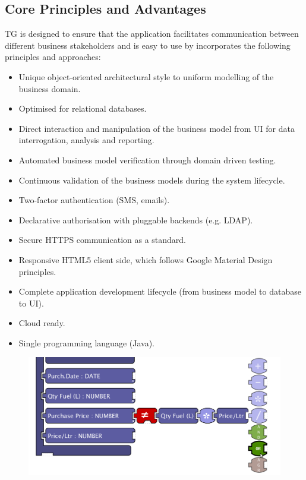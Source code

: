 \documentclass[a4paper,12pt,twocolumn,oneside,openright,final]{memoir}
\begin{document}
 \subsection*{Core Principles and Advantages}
  TG is designed to ensure that the application facilitates communication between different business stakeholders and is easy to use by incorporates the following principles and approaches:

  \begin{itemize}
    \item Unique object-oriented architectural style to uniform modelling of the business domain.
    \item Optimised for relational databases.
    \item Direct interaction and manipulation of the business model from UI for data interrogation, analysis and reporting.
    \item Automated business model verification through domain driven testing.
    \item Continuous validation of the business models during the system lifecycle.
    \item Two-factor authentication (SMS, emails).
    \item Declarative authorisation with pluggable backends (e.g. LDAP). 
    \item Secure HTTPS communication as a standard.
    \item Responsive HTML5 client side, which follows Google Material Design principles.
    \item Complete application development lifecycle (from business model to database to UI).
    \item Cloud ready.
    \item Single programming language (Java).
   \end{itemize}

  \begin{figure}[!h]
  \centering
  \includegraphics[scale=0.22]{images/01-rulesarea-suggestionmenu.png}  
  \end{figure}
\end{document}

